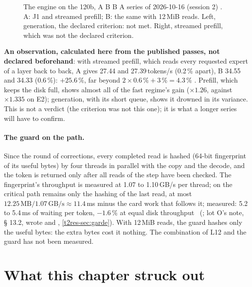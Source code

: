\begin{figure}[ht]
\centering
\GrapheChmLdouze
\caption[The engine: 12\,MiB reads (L12)]{The engine on the 120b, A B B A series of 2026-10-16 (session 2) \mes. A: J1 and streamed prefill; B: the same with 12\,MiB reads. Left, generation, the declared criterion: not met. Right, streamed prefill, which was not the declared criterion.}
\label{fig:t2c-l12}
\end{figure}

\textbf{An observation, calculated here from the published passes, not declared beforehand}: with streamed prefill, which reads every requested expert of a layer back to back, A gives 27.44 and 27.39\,tokens/s (0.2\,\% apart), B 34.55 and 34.33 (0.6\,\%): $+25.6\,\%$, far beyond $2 \times 0.6\,\% + 3\,\% = 4.3\,\%$ \calc. Prefill, which keeps the disk full, shows almost all of the fast regime's gain ($\times 1.26$, against $\times 1.335$ on E2); generation, with its short queue, shows it drowned in its variance. This is not a verdict (the criterion was not this one); it is what a longer series will have to confirm.

\paragraph{The guard on the path.} Since the round of corrections, every completed read is hashed (64-bit fingerprint of its useful bytes) by four threads in parallel with the copy and the decode, and the token is returned only after all reads of the step have been checked. The fingerprint's throughput is measured at 1.07 to 1.10\,GB/s per thread; on the critical path remains only the hashing of the last read, at most $12.25\,\text{MB} / 1.07\,\text{GB/s} \approx 11.4$\,ms minus the card work that follows it; measured: 5.2 to 5.4\,ms of waiting per token, $-1.6\,\%$ at equal disk throughput \mes~(; lot O's note, § 13.2, wrote  and , \cref{t2res-sec:garde}). With 12\,MiB reads, the guard hashes only the useful bytes: the extra bytes cost it nothing. The combination of L12 and the guard has not been measured.

\section{What this chapter struck out}\label{sec:t2c-barres}

